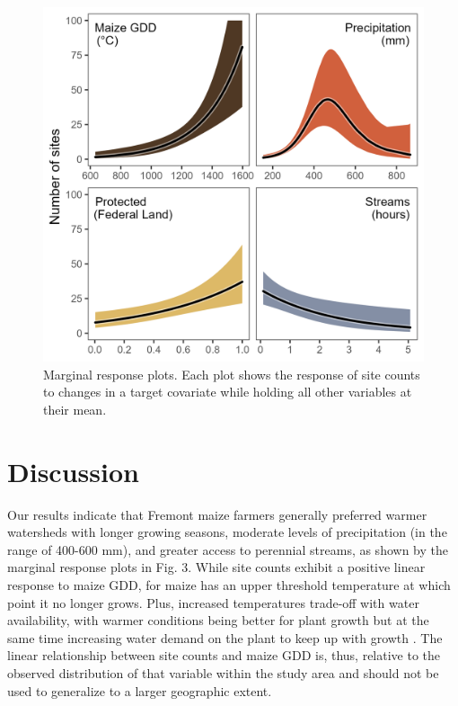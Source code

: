 \documentclass[
  number,
  preprint,
  3p]{elsarticle}
\begin{document}
\begin{figure}

{\centering \includegraphics[width=5in,height=\textheight]{../figures/marginal_response.png}

}

\caption{\label{fig-responses}Marginal response plots. Each plot shows
the response of site counts to changes in a target covariate while
holding all other variables at their mean.}

\end{figure}

\hypertarget{discussion}{%
\section{Discussion}\label{discussion}}

Our results indicate that Fremont maize farmers generally preferred
warmer watersheds with longer growing seasons, moderate levels of
precipitation (in the range of 400-600 mm), and greater access to
perennial streams, as shown by the marginal response plots in Fig. 3.
While site counts exhibit a positive linear response to maize GDD, for
maize has an upper threshold temperature at which point it no longer
grows. Plus, increased temperatures trade-off with water availability,
with warmer conditions being better for plant growth but at the same
time increasing water demand on the plant to keep up with growth
\citep{ramankutty2002}. The linear relationship between site counts and
maize GDD is, thus, relative to the observed distribution of that
variable within the study area and should not be used to generalize to a
larger geographic extent.
\end{document}
